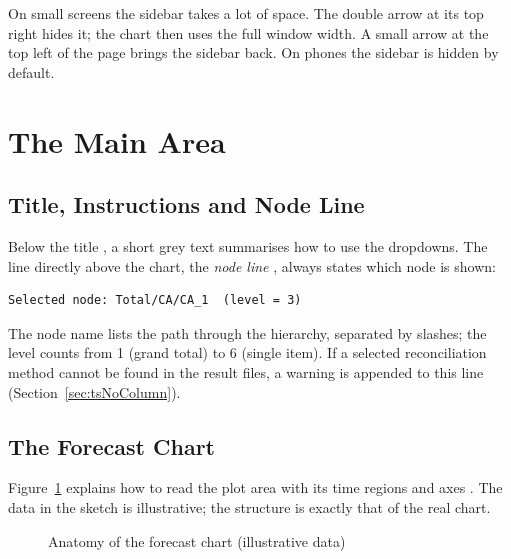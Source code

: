 On small screens the sidebar takes a lot of space. The double arrow  at its top right hides it; the chart then uses the full window width. A small arrow at the top left of the page brings the sidebar back. On phones the sidebar is hidden by default.

\section{The Main Area}
\label{sec:uiMain}

\subsection{Title, Instructions and Node Line}

Below the title , a short grey text summarises how to use the dropdowns. The line directly above the chart, the \emph{node line} , always states which node is shown:

\begin{lstlisting}[style=plain]
Selected node: Total/CA/CA_1  (level = 3)
\end{lstlisting}

The node name lists the path through the hierarchy, separated by slashes; the level counts from 1 (grand total) to 6 (single item). If a selected reconciliation method cannot be found in the result files, a warning is appended to this line (Section~\ref{sec:tsNoColumn}).

\subsection{The Forecast Chart}
\label{sec:uiChart}

Figure~\ref{fig:chartAnatomy} explains how to read the plot area  with its time regions  and axes . The data in the sketch is illustrative; the structure is exactly that of the real chart.

\begin{figure}[H]
  \centering
  
  \caption{Anatomy of the forecast chart (illustrative data)}
  \label{fig:chartAnatomy}
\end{figure}


